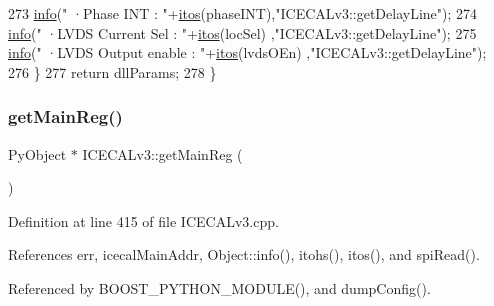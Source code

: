 \begin{DoxyCode}
273         \hyperlink{classObject_a644fd329ea4cb85f54fa6846484b84a8}{info}(\textcolor{stringliteral}{"   ·Phase INT          : "}+\hyperlink{Tools_8h_af330027dbdafb9a30768b3613c553e60}{itos}(phaseINT),\textcolor{stringliteral}{"ICECALv3::getDelayLine"});
274         \hyperlink{classObject_a644fd329ea4cb85f54fa6846484b84a8}{info}(\textcolor{stringliteral}{"   ·LVDS Current Sel   : "}+\hyperlink{Tools_8h_af330027dbdafb9a30768b3613c553e60}{itos}(locSel)  ,\textcolor{stringliteral}{"ICECALv3::getDelayLine"});
275         \hyperlink{classObject_a644fd329ea4cb85f54fa6846484b84a8}{info}(\textcolor{stringliteral}{"   ·LVDS Output enable : "}+\hyperlink{Tools_8h_af330027dbdafb9a30768b3613c553e60}{itos}(lvdsOEn) ,\textcolor{stringliteral}{"ICECALv3::getDelayLine"});
276     \}
277     \textcolor{keywordflow}{return} dllParams;
278 \}
\end{DoxyCode}
\mbox{\label{classICECALv3_a4a414d23c1e199b446dc876161338148}} 
\subsubsection{\texorpdfstring{get\+Main\+Reg()}{getMainReg()}}
{\footnotesize\ttfamily Py\+Object $\ast$ I\+C\+E\+C\+A\+Lv3\+::get\+Main\+Reg (\begin{DoxyParamCaption}{ }\end{DoxyParamCaption})}



Definition at line 415 of file I\+C\+E\+C\+A\+Lv3.\+cpp.



References err, icecal\+Main\+Addr, Object\+::info(), itohs(), itos(), and spi\+Read().



Referenced by B\+O\+O\+S\+T\+\_\+\+P\+Y\+T\+H\+O\+N\+\_\+\+M\+O\+D\+U\+L\+E(), and dump\+Config().


